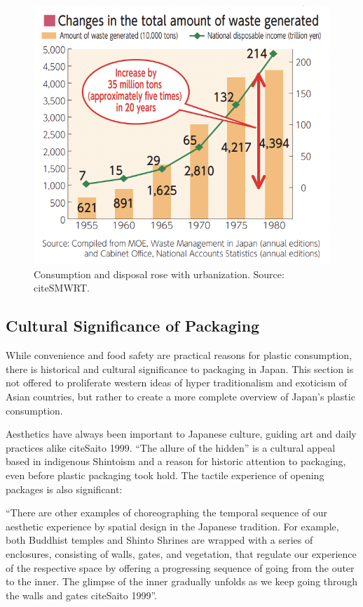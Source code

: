 \documentclass{book}\usepackage{knitr}
\begin{document}
\begin{figure}[h]
\includegraphics[width=\linewidth]{images/JapanPlastics/wealthwaste.png}
\caption{Consumption and disposal rose with urbanization. Source: citeSMWRT.}
\label{fig:wealthwaste}
\end{figure}
	
\subsection{Cultural Significance of Packaging} 

While convenience and food safety are practical reasons for plastic consumption, there is historical and cultural significance to packaging in Japan. This section is not offered to proliferate western ideas of hyper traditionalism and exoticism of Asian countries, but rather to create a more complete overview of Japan's plastic consumption. 

Aesthetics have always been important to Japanese culture, guiding art and daily practices alike citeSaito 1999. ``The allure of the hidden'' is a cultural appeal based in indigenous Shintoism and a reason for historic attention to packaging, even before plastic packaging took hold. The tactile experience of opening packages is also significant:

``There are other examples of choreographing the temporal sequence of our aesthetic experience by spatial design in the Japanese tradition. For example, both Buddhist temples and Shinto Shrines are wrapped with a series of enclosures, consisting of walls, gates, and vegetation, that regulate our experience of the respective space by offering a progressing sequence of going from the outer to the inner. The glimpse of the inner gradually unfolds as we keep going through the walls and gates citeSaito 1999''.
\end{document}
